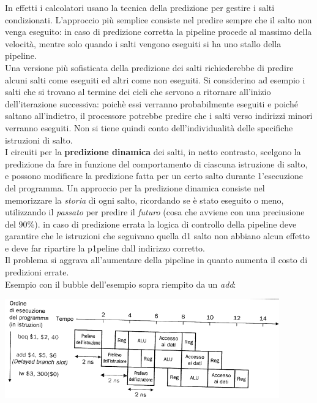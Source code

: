 \documentclass[a4paper,12pt, oneside]{book}
\begin{document}
\begin{enumerate}
\begin{enumerate}
    In effetti i calcolatori usano la tecnica della predizione per gestire i salti condizionati. L'approccio più semplice consiste nel predire sempre che il salto non venga
    eseguito: in caso di predizione corretta la pipeline procede al massimo della velocità, mentre solo quando i salti vengono eseguiti si ha uno stallo della pipeline.\\
    Una versione più sofisticata della predizione dei salti richiederebbe di predire alcuni salti come eseguiti ed altri come non eseguiti. Si considerino ad esempio i salti che si trovano al termine dei cicli che servono a ritornare all'inizio dell'iterazione successiva: poichè
    essi verranno probabilmente eseguiti e poiché saltano all'indietro, il processore
    potrebbe predire che i salti verso indirizzi minori verranno eseguiti. Non si tiene quindi conto dell'individualità delle specifiche istruzioni di salto.\\
    I circuiti per la\textbf{ predizione dinamica} dei salti, in netto contrasto,
    scelgono la predizione da fare in funzione del comportamento di ciascuna istruzione di salto, e possono modificare la predizione fatta per un certo salto durante 1'esecuzione del programma. Un approccio per la predizione dinamica consiste nel memorizzare la \textit{storia} di ogni salto, ricordando se è stato eseguito o meno, utilizzando il \textit{passato} per predire il \textit{futuro} (cosa che avviene con una preciusione del $90\%$).
    in caso di predizione errata la logica di controllo della pipeline deve garantire che le istruzioni che seguivano quella d1 salto non abbiano alcun effetto
    e deve far ripartire la p1peline dall indirizzo corretto.\\
    Il problema si aggrava all'aumentare della pipeline in quanto aumenta il costo di predizioni errate.\\
    Esempio con il bubble dell'esempio sopra riempito da un \textit{add}:
    \begin{center}
      \includegraphics[scale = 0.7]{img/pre.png}
    \end{center}
  \end{enumerate}

\end{enumerate}
\end{document}
